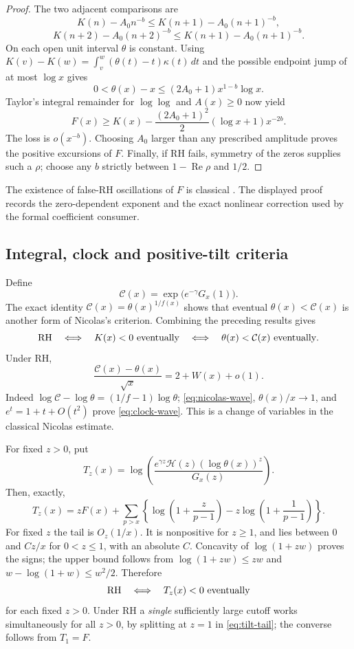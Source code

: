 \documentclass[11pt]{article}
\theoremstyle{definition}
\begin{document}
\begin{proof}
The two adjacent comparisons are
\[
 K(n)-A_0n^{-b}\le K(n+1)-A_0(n+1)^{-b},
\]
\[
 K(n+2)-A_0(n+2)^{-b}\le K(n+1)-A_0(n+1)^{-b}.
\]
On each open unit interval $\theta$ is constant. Using
$K(v)-K(w)=\int_v^w(\theta(t)-t)\kappa(t)\,dt$ and the possible
endpoint jump of at most $\log x$ gives
\[
 0<\theta(x)-x\le(2A_0+1)x^{1-b}\log x.
\]
Taylor's integral remainder for $\log\log$ and $A(x)\ge0$ now yield
\[
 F(x)\ge K(x)
 -\frac{(2A_0+1)^2}{2}(\log x+1)x^{-2b}.
\]
The loss is $o(x^{-b})$. Choosing $A_0$ larger than any prescribed
amplitude proves the positive excursions of $F$. Finally, if RH
fails, symmetry of the zeros supplies such a $\rho$; choose any
$b$ strictly between $1-\operatorname{Re}\rho$ and $1/2$.
\end{proof}
The existence of false-RH oscillations of $F$ is classical
\cite{Nicolas1983,Nicolas2012}. The displayed proof records the
zero-dependent exponent and the exact nonlinear correction used by
the formal coefficient consumer.

\subsection{Integral, clock and positive-tilt criteria}
Define
\[
 \mathcal C(x)=\exp\bigl(e^{-\gamma}G_x(1)\bigr).
\]
The exact identity $\mathcal C(x)=\theta(x)^{1/f(x)}$ shows that
eventual $\theta(x)<\mathcal C(x)$ is another form of Nicolas's
criterion. Combining the preceding results gives
\begin{equation}\label{eq:rh-equivalences}
 \mathrm{RH}\quad\Longleftrightarrow\quad
 K(x)<0\ \hbox{eventually}
 \quad\Longleftrightarrow\quad
 \theta(x)<\mathcal C(x)\ \hbox{eventually}.
\end{equation}
Under RH,
\begin{equation}\label{eq:clock-wave}
 \frac{\mathcal C(x)-\theta(x)}{\sqrt{x}}
       =2+W(x)+o(1).
\end{equation}
Indeed $\log\mathcal C-\log\theta=(1/f-1)\log\theta$;
\eqref{eq:nicolas-wave}, $\theta(x)/x\to1$, and
$e^t=1+t+O(t^2)$ prove \eqref{eq:clock-wave}.
This is a change of variables in the classical Nicolas estimate.

For fixed $z>0$, put
\[
 T_z(x)=\log\left(
       \frac{e^{\gamma z}\mathcal H(z)(\log\theta(x))^z}{G_x(z)}
       \right).
\]
Then, exactly,
\begin{equation}\label{eq:tilt-tail}
 T_z(x)=zF(x)+\sum_{p>x}
 \left\{\log\left(1+\frac z{p-1}\right)
                 -z\log\left(1+\frac1{p-1}\right)\right\}.
\end{equation}
For fixed $z$ the tail is $O_z(1/x)$. It is nonpositive for
$z\ge1$, and lies between $0$ and $Cz/x$ for $0<z\le1$,
with an absolute $C$. Concavity of $\log(1+zw)$ proves the
signs; the upper bound follows from
$\log(1+zw)\le zw$ and $w-\log(1+w)\le w^2/2$.
Therefore
\[
 \mathrm{RH}\quad\Longleftrightarrow\quad
 T_z(x)<0\ \hbox{eventually}
\]
for each fixed $z>0$. Under RH a \emph{single} sufficiently large
cutoff works simultaneously for all $z>0$, by splitting at $z=1$
in \eqref{eq:tilt-tail}; the converse follows from $T_1=F$.
\end{document}
